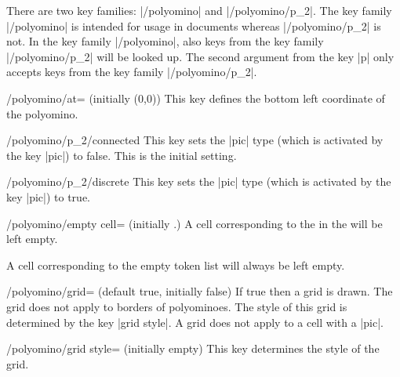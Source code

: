 \documentclass[a4paper,english,dvipsnames]{ltxdoc}
\begin{document}
There are two key families: |/polyomino| and |/polyomino/p_2|. The key family |/polyomino| is intended for usage in documents whereas |/polyomino/p_2| is not. In the key family |/polyomino|, also keys from the key family |/polyomino/p_2| will be looked up. The second argument from the key |p| only accepts keys from the key family |/polyomino/p_2|.
\begin{key}{/polyomino/at= (initially (0,0))}
This key defines the bottom left coordinate of the polyomino.
\end{key}
\begin{key}{/polyomino/p\_2/connected}
This key sets the |pic| type (which is activated by the key |pic|) to false. This is the initial setting.
\end{key}
\begin{key}{/polyomino/p\_2/discrete}
This key sets the |pic| type (which is activated by the key |pic|) to true.
\end{key}
\begin{key}{/polyomino/empty cell= (initially .)}
A cell corresponding to the  in the  will be left empty.

A cell corresponding to the empty token list will always be left empty.
\end{key}
\begin{key}{/polyomino/grid= (default true, initially false)}
If true then a grid is drawn. The grid does not apply to borders of polyominoes. The style of this grid is determined by the key |grid style|. A grid does not apply to a cell with a |pic|.
\end{key}
\begin{stylekey}{/polyomino/grid style= (initially \normalfont empty)}
This key determines the style of the grid.
\begin{codeexample}[width=6.5cm]
\end{codeexample}
\end{stylekey}
\end{document}
